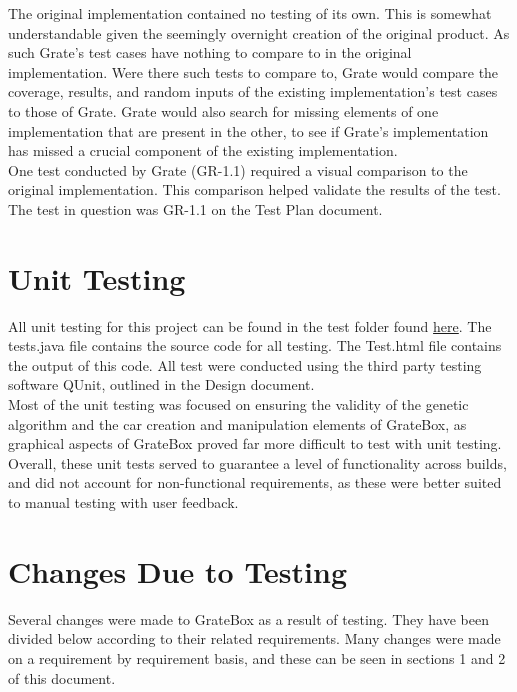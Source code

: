 \documentclass[12pt, titlepage]{article}
\begin{document}
The original implementation contained no testing of its own. This is somewhat understandable given the seemingly overnight creation of the original product. As such Grate's test cases have nothing to compare to in the original implementation. Were there such tests to compare to, Grate would compare the coverage, results, and random inputs of the existing implementation's test cases to those of Grate. Grate would also search for missing elements of one implementation that are present in the other, to see if Grate's implementation has missed a crucial component of the existing implementation.\\

One test conducted by Grate (GR-1.1) required a visual comparison to the original implementation. This 
comparison helped validate the results of the test. The test in question was GR-1.1 on the Test Plan document. 

\section{Unit Testing}

All unit testing for this project can be found in the test folder found 
\href{https://gitlab.cas.mcmaster.ca/linkk4/GrateBox/tree/master/src/test}{here}. 
The tests.java file contains the source code for all testing. The Test.html file 
contains the output of this code. All test were conducted using the third party 
testing software QUnit, outlined in the Design document.\\

Most of the unit testing was focused on ensuring the validity of the genetic algorithm and the car creation and manipulation elements of GrateBox, as graphical aspects of GrateBox proved far more difficult to test with unit testing.\\

Overall, these unit tests served to guarantee a level of functionality across builds, and did not account for non-functional requirements, as these were better suited to manual testing with user feedback.

\section{Changes Due to Testing}

Several changes were made to GrateBox as a result of testing. They have been 
divided below according to their related requirements. Many changes were made on a requirement by requirement basis, and these can be seen in sections 1 and 2 of this document.
\end{document}
